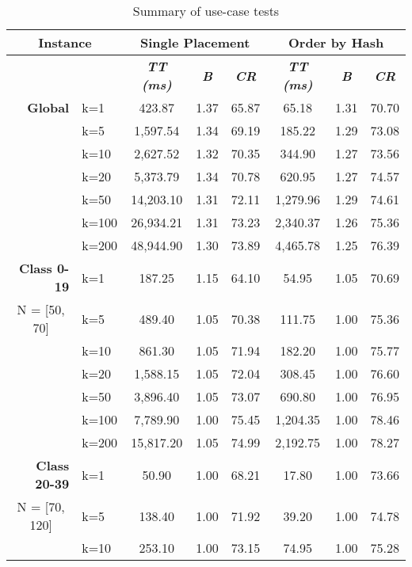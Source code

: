 \begin{table}[htbp]
    \caption{Summary of use-case tests}
    \begin{tabular}{|l|l|c|c|c|c|c|c|}
    \hline
    \multicolumn{ 2}{|c|}{\textbf{Instance}} & \multicolumn{ 3}{c|}{\textbf{Single Placement}} & \multicolumn{ 3}{c|}{\textbf{Order by Hash}} \\ \hline
    \multicolumn{ 2}{|l|}{} & \textbf{\textit{TT (ms)}} & \textbf{\textit{B}} & \textbf{\textit{CR}} & \textbf{\textit{TT (ms)}} & \textbf{\textit{B}} & \textbf{\textit{CR}} \\ \hline
    \multicolumn{1}{|r|}{\textbf{Global}} & k=1 & 423.87 & 1.37 & 65.87 & 65.18 & 1.31 & 70.70 \\ 
     & k=5 & 1,597.54 & 1.34 & 69.19 & 185.22 & 1.29 & 73.08 \\ 
     & k=10 & 2,627.52 & 1.32 & 70.35 & 344.90 & 1.27 & 73.56 \\ 
     & k=20 & 5,373.79 & 1.34 & 70.78 & 620.95 & 1.27 & 74.57 \\ 
     & k=50 & 14,203.10 & 1.31 & 72.11 & 1,279.96 & 1.29 & 74.61 \\ 
     & k=100 & 26,934.21 & 1.31 & 73.23 & 2,340.37 & 1.26 & 75.36 \\ 
     & k=200 & 48,944.90 & 1.30 & 73.89 & 4,465.78 & 1.25 & 76.39 \\ \hline
    \multicolumn{1}{|r|}{\textbf{Class 0-19}} & k=1 & 187.25 & 1.15 & 64.10 & 54.95 & 1.05 & 70.69 \\ 
    \multicolumn{1}{|c|}{N = [50, 70]} & k=5 & 489.40 & 1.05 & 70.38 & 111.75 & 1.00 & 75.36 \\ 
     & k=10 & 861.30 & 1.05 & 71.94 & 182.20 & 1.00 & 75.77 \\ 
     & k=20 & 1,588.15 & 1.05 & 72.04 & 308.45 & 1.00 & 76.60 \\ 
     & k=50 & 3,896.40 & 1.05 & 73.07 & 690.80 & 1.00 & 76.95 \\ 
     & k=100 & 7,789.90 & 1.00 & 75.45 & 1,204.35 & 1.00 & 78.46 \\ 
     & k=200 & 15,817.20 & 1.05 & 74.99 & 2,192.75 & 1.00 & 78.27 \\ \hline
    \multicolumn{1}{|r|}{\textbf{Class 20-39}} & k=1 & 50.90 & 1.00 & 68.21 & 17.80 & 1.00 & 73.66 \\ 
    \multicolumn{1}{|c|}{N = [70, 120]} & k=5 & 138.40 & 1.00 & 71.92 & 39.20 & 1.00 & 74.78 \\ 
     & k=10 & 253.10 & 1.00 & 73.15 & 74.95 & 1.00 & 75.28 \\ 

\end{tabular}
\end{table}
